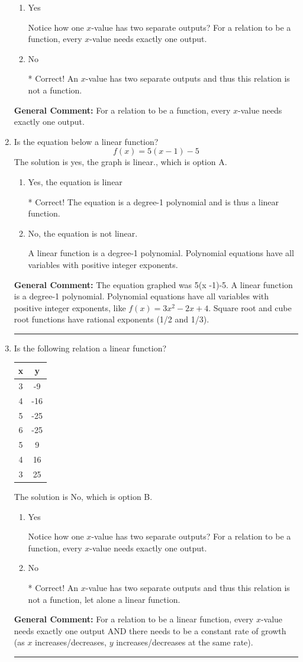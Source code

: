 \documentclass{extbook}[14pt]
\newcommand{\litem}[1]{\item #1

\rule{\textwidth}{0.4pt}}
\begin{document}
\begin{enumerate}
{\begin{enumerate}[label=\Alph*.]
\item Yes

Notice how one $x$-value has two separate outputs? For a relation to be a function, every $x$-value needs exactly one output.
\item No

* Correct! An $x$-value has two separate outputs and thus this relation is not a function.
\end{enumerate}


\textbf{General Comment:} For a relation to be a function, every $x$-value needs exactly one output.
}
\litem{
Is the equation below a linear function?
\[ f(x) = 5(x -1)-5 \]The solution is yes, the graph is linear., which is option A.

\begin{enumerate}[label=\Alph*.]
\item Yes, the equation is linear

* Correct! The equation is a degree-1 polynomial and is thus a linear function.
\item No, the equation is not linear.

A linear function is a degree-1 polynomial. Polynomial equations have all variables with positive integer exponents.
\end{enumerate}


\textbf{General Comment:} The equation graphed was 5(x -1)-5. A linear function is a degree-1 polynomial. Polynomial equations have all variables with positive integer exponents, like $f(x) = 3x^2-2x+4$. Square root and cube root functions have rational exponents (1/2 and 1/3).
}
\litem{
Is the following relation a linear function?


\begin{tabular}{c|c}
x &y\tabularnewline \hline
3 &-9\tabularnewline \hline
4 &-16\tabularnewline \hline
5 &-25\tabularnewline \hline
6 &-25\tabularnewline \hline
5 &9\tabularnewline \hline
4 &16\tabularnewline \hline
3 &25\end{tabular}The solution is No, which is option B.

\begin{enumerate}[label=\Alph*.]
\item Yes

Notice how one $x$-value has two separate outputs? For a relation to be a function, every $x$-value needs exactly one output.
\item No

* Correct! An $x$-value has two separate outputs and thus this relation is not a function, let alone a linear function.
\end{enumerate}


\textbf{General Comment:} For a relation to be a linear function, every $x$-value needs exactly one output AND there needs to be a constant rate of growth (as $x$ increases/decreases, $y$ increases/decreases at the same rate).
}
\end{enumerate}
\end{document}
